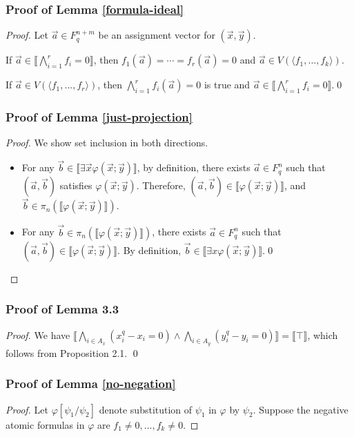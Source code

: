 \documentclass[envcountsect]{llncs}
\begin{document}
{{\subsubsection{Proof of Lemma \ref{formula-ideal}}
\begin{proof}
Let $\vec a\in F_q^{n+m}$ be an assignment vector for $(\vec x, \vec y)$.

If $\vec a\in \llbracket \bigwedge_{i=1}^r f_i = 0 \rrbracket$, then $f_1(\vec a)=\cdots = f_r(\vec a) = 0$ and $\vec a\in V(\langle f_1,...,f_k\rangle)$. 

If $\vec a\in V(\langle f_1,...,f_r\rangle)$, then $\bigwedge_{i=1}^r f_i(\vec a) = 0$ is true and $\vec a \in \llbracket \bigwedge_{i=1}^r f_i = 0 \rrbracket $.\qed
\end{proof}

\subsubsection{Proof of Lemma \ref{just-projection}}
\begin{proof} We show set inclusion in both directions.
\begin{itemize}
 \item
For any $\vec b \in \llbracket\exists \vec x \varphi (\vec x; \vec y)\rrbracket$, by definition, there exists $\vec a\in F_q^n$ such that $(\vec a,\vec b)$ satisfies $\varphi(\vec x; \vec y)$. Therefore, $(\vec a,\vec b) \in \llbracket\varphi(\vec x; \vec y)\rrbracket$, and $\vec b\in \pi_n (\llbracket\varphi(\vec x; \vec y)\rrbracket)$.
\item 
For any $\vec b \in \pi_n (\llbracket\varphi(\vec x; \vec y)\rrbracket)$, there exists $\vec a\in F_q^n$ such that $(\vec a, \vec b)\in \llbracket\varphi(\vec x; \vec y)\rrbracket$. By definition, $\vec b\in \llbracket\exists x \varphi (\vec x; \vec y)\rrbracket$.\qed
\end{itemize}
\end{proof}

\subsubsection{Proof of Lemma 3.3}
\begin{proof}
We have $\llbracket \bigwedge_{i\in A_x} (x_i^q-x_i=0)\wedge \bigwedge_{i\in A_y} (y_i^q-y_i=0) \rrbracket = \llbracket \top \rrbracket$, which follows from Proposition 2.1. \qed
\end{proof}


\subsubsection{Proof of Lemma \ref{no-negation}}
\begin{proof}
Let $\varphi[\psi_1/\psi_2]$ denote substitution of $\psi_1$ in $\varphi$ by $\psi_2$. Suppose the negative atomic formulas in $\varphi$ are $f_1\neq 0,...,f_k\neq 0$. 


\end{proof}}}
\end{document}
